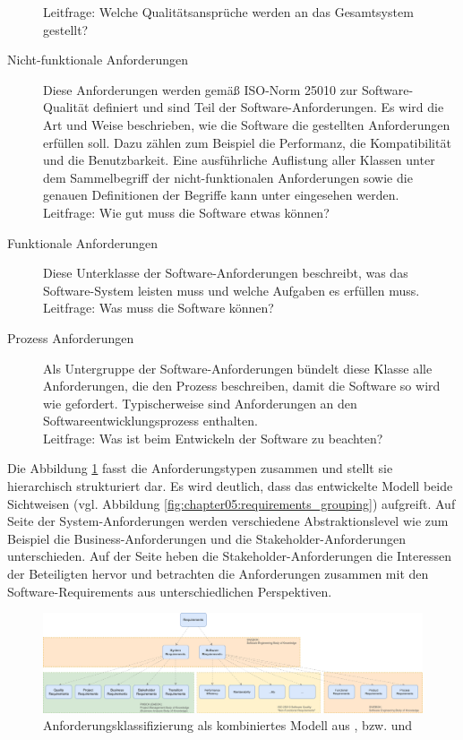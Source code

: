 \begin{description}
  Leitfrage: \glqq Welche Qualitätsansprüche werden an das Gesamtsystem gestellt? \grqq
  \item[Nicht-funktionale Anforderungen] Diese Anforderungen werden gemäß \ac{ISO}-Norm 25010 zur Software-Qualität definiert und sind Teil der Software-Anforderungen. Es wird die Art und Weise beschrieben, wie die Software die gestellten Anforderungen erfüllen soll. Dazu zählen zum Beispiel die Performanz, die Kompatibilität und die Benutzbarkeit. Eine ausführliche Auflistung aller Klassen unter dem Sammelbegriff der nicht-funktionalen Anforderungen sowie die genauen Definitionen der Begriffe kann unter \cite{ISO25010} eingesehen werden. \\
  Leitfrage: \glqq Wie gut muss die Software etwas können? \grqq
  \item[Funktionale Anforderungen] Diese Unterklasse der Software-Anforderungen beschreibt, was das Software-System leisten muss und welche Aufgaben es erfüllen muss.\\
  Leitfrage: \glqq Was muss die Software können? \grqq
  \item[Prozess Anforderungen] Als Untergruppe der Software-Anforderungen bündelt diese Klasse alle Anforderungen, die den Prozess beschreiben, damit die Software so wird wie gefordert. Typischerweise sind Anforderungen an den Softwareentwicklungsprozess enthalten.\\
  Leitfrage: \glqq Was ist beim Entwickeln der Software zu beachten? \grqq
  \end{description}

Die Abbildung \ref{fig:chapter05:requirements_hierarchy} fasst die Anforderungstypen zusammen und stellt sie hierarchisch strukturiert dar. Es wird deutlich, dass das entwickelte Modell beide Sichtweisen (vgl. Abbildung \ref{fig:chapter05:requirements_grouping}) aufgreift. Auf Seite der System-Anforderungen werden verschiedene Abstraktionslevel wie zum Beispiel die Business-Anforderungen und die Stakeholder-Anforderungen unterschieden. Auf der Seite heben die Stakeholder-Anforderungen die Interessen der Beteiligten hervor und betrachten die Anforderungen zusammen mit den Software-Requirements aus unterschiedlichen Perspektiven.

\begin{figure}[htbp]
 \centering
 \includegraphics[width=1.0\textwidth]{gfx/Requirements_Hierarchy.png}
 \caption{Anforderungsklassifizierung als kombiniertes Modell aus \cite{SWEBOK}, \cite{PMBOK} bzw. \cite{BABOK} und \cite{ISO25010}}
 \label{fig:chapter05:requirements_hierarchy}
\end{figure}

